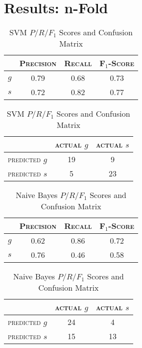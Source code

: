 \section{Results: n-Fold}
\begin{table}[ht]
\begin{minipage}[b]{0.45\linewidth}\centering
\begin{tabular}{ c | c  c  c }
	& \textsc{Precision} & \textsc{Recall} & \textsc{F$_1$-Score} \\
	\hline
	\textsc{$g$} 	& 0.79 & 0.68 & 0.73 \\
	\textsc{$s$}	& 0.72 & 0.82 & 0.77
\end{tabular}
\end{minipage}
\hspace{0.5cm}
\begin{minipage}[b]{0.45\linewidth}
\centering
\begin{tabular}{ c | c  c }
	 & \textsc{actual $g$} & \textsc{actual $s$} \\
	\hline
	\textsc{predicted $g$} 	& 19 & 9 \\
	\textsc{predicted $s$}		& 5 & 23
\end{tabular}
\end{minipage}
\caption{SVM $P/R/F_1$ Scores and Confusion Matrix}
\end{table}

\begin{table}[ht]
\begin{minipage}[b]{0.45\linewidth}\centering
\begin{tabular}{ c | c  c  c }
	& \textsc{Precision} & \textsc{Recall} & \textsc{F$_1$-Score} \\
	\hline
	\textsc{$g$} 	& 0.62 & 0.86 & 0.72 \\
	\textsc{$s$}	& 0.76 & 0.46 & 0.58
\end{tabular}
\end{minipage}
\hspace{0.5cm}
\begin{minipage}[b]{0.45\linewidth}
\centering
\begin{tabular}{ c | c  c }
	 & \textsc{actual $g$} & \textsc{actual $s$} \\
	\hline
	\textsc{predicted $g$} 	& 24 & 4 \\
	\textsc{predicted $s$}		& 15 & 13
\end{tabular}
\end{minipage}
\caption{Naive Bayes $P/R/F_1$ Scores and Confusion Matrix}
\end{table}

